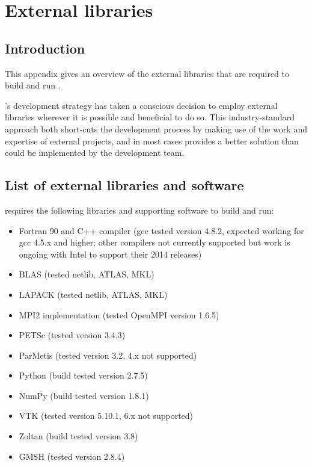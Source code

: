 \chapter{External libraries}\label{chap:external}

\section{Introduction}

This appendix gives an overview of the external libraries that are required to
build and run \fluidity.

\fluidity's development strategy has taken a conscious decision to employ
external libraries wherever it is possible and beneficial to do so. This
industry-standard approach both short-cuts the development process by making
use of the work and expertise of external projects, and in most cases provides
a better solution than could be implemented by the \fluidity development team.

\section{List of external libraries and software}
\label{sec:required_ḻibraries_list}

\fluidity requires the following libraries and supporting software to build and
run:

\begin{itemize}
\item Fortran 90 and C++ compiler (gcc tested version 4.8.2, expected working for gcc 4.5.x and higher; other compilers not currently supported but work is ongoing with Intel to support their 2014 releases)
\item BLAS (tested netlib, ATLAS, MKL)
\item LAPACK (tested netlib, ATLAS, MKL)
\item MPI2 implementation (tested OpenMPI version 1.6.5)
\item PETSc (tested version 3.4.3)
\item ParMetis (tested version 3.2, 4.x not supported)
\item Python (build tested version 2.7.5)
\item NumPy (build tested version 1.8.1)
\item VTK (tested version 5.10.1, 6.x not supported)
\item Zoltan (build tested version 3.8)
\item GMSH (tested version 2.8.4)
\end{itemize}

